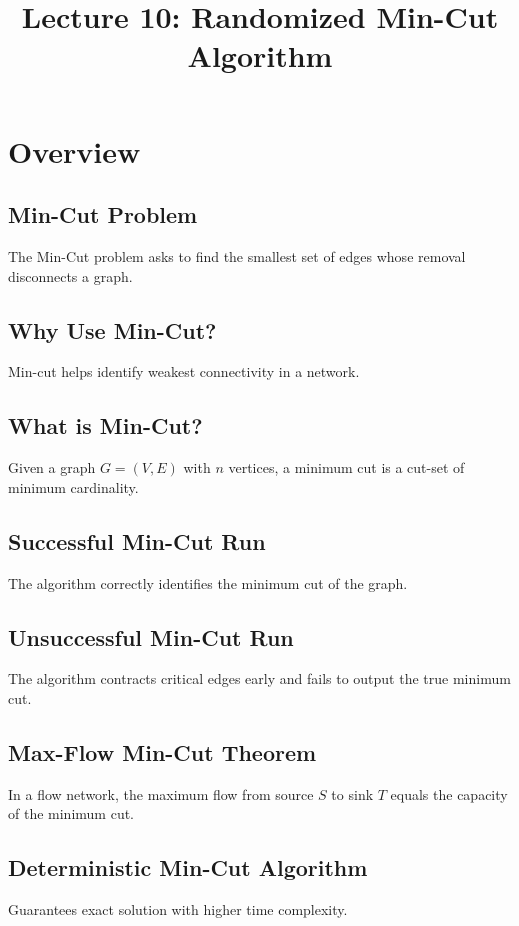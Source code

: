 \documentclass[12pt]{article}
\title{\textbf{Lecture 10: Randomized Min-Cut Algorithm}}
\author{}
\date{}
\begin{document}
\maketitle
\tableofcontents
\newpage

\section{Overview}

\subsection{Min-Cut Problem}
The Min-Cut problem asks to find the smallest set of edges whose removal disconnects a graph.

\subsection{Why Use Min-Cut?}
Min-cut helps identify weakest connectivity in a network.

\subsection{What is Min-Cut?}
Given a graph $G=(V,E)$ with $n$ vertices, a minimum cut is a cut-set of minimum cardinality.

\subsection{Successful Min-Cut Run}
The algorithm correctly identifies the minimum cut of the graph.

\subsection{Unsuccessful Min-Cut Run}
The algorithm contracts critical edges early and fails to output the true minimum cut.

\subsection{Max-Flow Min-Cut Theorem}
In a flow network, the maximum flow from source $S$ to sink $T$ equals the capacity of the minimum cut.

\subsection{Deterministic Min-Cut Algorithm}
Guarantees exact solution with higher time complexity.
\end{document}
